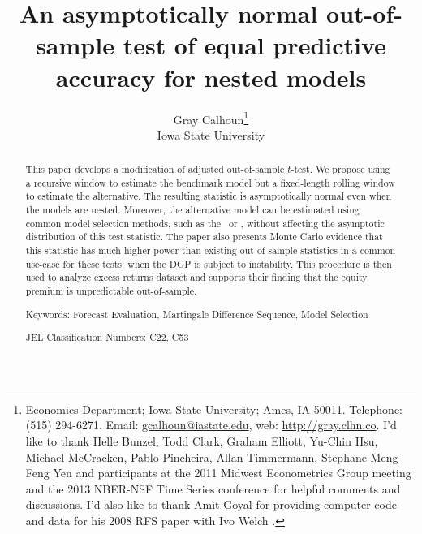 \documentclass[12pt,fleqn]{article}
\author{Gray Calhoun\thanks{ Economics Department; Iowa State
    University; Ames, IA 50011.  Telephone: (515) 294-6271.  Email:
    \guillemotleft \protect\url{gcalhoun@iastate.edu}\guillemotright,
    web: \guillemotleft \protect\url{http://gray.clhn.co}\guillemotright.
    I'd like to
    thank Helle Bunzel, Todd Clark, Graham Elliott, Yu-Chin Hsu,
    Michael McCracken, Pablo Pincheira, Allan Timmermann, Stephane
    Meng-Feng Yen and participants at the 2011 Midwest Econometrics
    Group meeting and the 2013 NBER-NSF Time Series conference
    for helpful comments and discussions.  I'd also like to thank Amit
    Goyal for providing computer code and data for his 2008
    RFS paper with Ivo Welch \citep{GoW:08}.}\\%
  Iowa State University}
\title{An asymptotically normal out-of-sample
  test of equal predictive accuracy for nested models}
\begin{document}
\maketitle

\begin{abstract} 
  \noindent This paper develops a modification of  adjusted out-of-sample $t$-test. We propose
  using a recursive window to estimate the benchmark model but a
  fixed-length rolling window to estimate the alternative. The
  resulting statistic is asymptotically normal even when the models
  are nested.  Moreover, the alternative model can be estimated using
  common model selection methods, such as the \aic\ or \bic, without
  affecting the asymptotic distribution of this test statistic.  The
  paper also presents Monte Carlo evidence that this statistic has
  much higher power than existing out-of-sample statistics in a common
  use-case for these tests: when the DGP is subject to instability.
  This procedure is then used to analyze
   excess returns dataset
  and supports their finding that the equity premium is unpredictable
  out-of-sample.

\strut

\noindent Keywords: Forecast Evaluation, Martingale Difference
Sequence, Model Selection

\strut

\noindent JEL Classification Numbers: C22, C53

\end{abstract}

\newpage 
\end{document}
